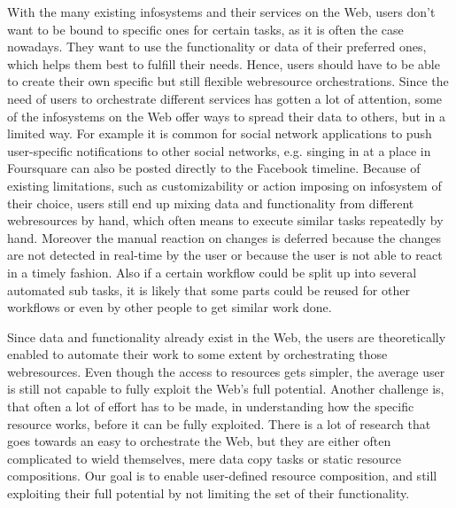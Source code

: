 With the many existing \textrm{\glspl{infosystem}} and their services on the Web, users don't want to be bound to specific ones for certain tasks, as it is often the case nowadays.
They want to use the functionality or data of their preferred ones, which helps them best to fulfill their needs.
Hence, users should have to be able to create their own specific but still flexible \textrm{\gls{webresource}} orchestrations.
Since the need of users to orchestrate different services has gotten a lot of attention, some of the \textrm{\glspl{infosystem}} on the Web offer ways to spread their data to others, but in a limited way.
For example it is common for social network applications to push user-specific notifications to other social networks, e.g. singing in at a place in \textrm{Foursquare} can also be posted directly to the \textrm{Facebook} timeline.
Because of existing limitations, such as customizability or action imposing on \textrm{\gls{infosystem}} of their choice, users still end up mixing data and functionality from different \textrm{\glspl{webresource}} by hand, which often means to execute similar tasks repeatedly by hand.
Moreover the manual reaction on changes is deferred because the changes are not detected in real-time by the user or because the user is not able to react in a timely fashion.
Also if a certain workflow could be split up into several automated sub tasks, it is likely that some parts could be reused for other workflows or even by other people to get similar work done. %

Since data and functionality already exist in the Web, the users are theoretically enabled to automate their work to some extent by orchestrating those \textrm{\glspl{webresource}}.
Even though the access to resources gets simpler, the average user is still not capable to fully exploit the Web's full potential.
Another challenge is, that often a lot of effort has to be made, in understanding how the specific resource works, before it can be fully exploited.
There is a lot of research that goes towards an easy to orchestrate the Web, but they are either often complicated to wield themselves, mere data copy tasks or static resource compositions.
Our goal is to enable user-defined resource composition, and still exploiting their full potential by not limiting the set of their functionality.


